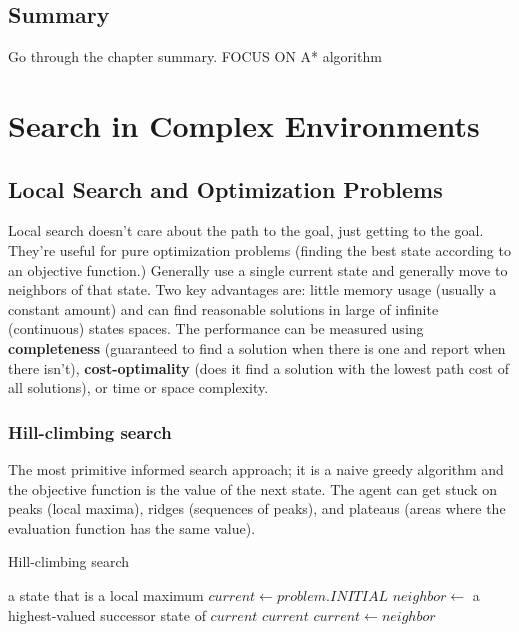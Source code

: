 \documentclass[exam={Midterm},color=true]{cs581exam}
\renewcommand{\emph}[1]{\textbf{#1}}
\begin{document}
\subsection{Summary}\label{subsec:3-summary}
Go through the chapter summary. FOCUS ON A* algorithm

\section{Search in Complex Environments}\label{sec:search-in-complex-environments}
\subsection{Local Search and Optimization Problems}\label{subsec:local-search-and-optimization-problems}
Local search doesn't care about the path to the goal, just getting to the goal.
They're useful for pure optimization problems (finding the best state according to an objective function.)
Generally use a single current state and generally move to neighbors of that state.
Two key advantages are: little memory usage (usually a constant amount) and can find reasonable solutions in large of infinite (continuous) states spaces.
The performance can be measured using \emph{completeness} (guaranteed to find a solution when there is one and report when there isn't), \emph{cost-optimality} (does it find a solution with the lowest path cost of all solutions), or time or space complexity.
%
\subsubsection{Hill-climbing search}\label{subsubsec:4.1.1}
The most primitive informed search approach; it is a naive greedy algorithm and the objective function is the value of the next state.
The agent can get stuck on peaks (local maxima), ridges (sequences of peaks), and plateaus (areas where the evaluation function has the same value).
\begin{algorithm}[H]
	\caption{Hill-climbing search}\label{alg:hill-climbing}
	\begin{algorithmic}[1]
	 \Returns a state that is a local maximum
		\State $current\gets problem.INITIAL$
			\State $neighbor\gets$ a highest-valued successor state of $current$
				\Return $current$
			\EndIf
			\State $current\gets neighbor$
		\EndWhile
	\EndFunction
	\end{algorithmic}
\end{algorithm}
\end{document}
